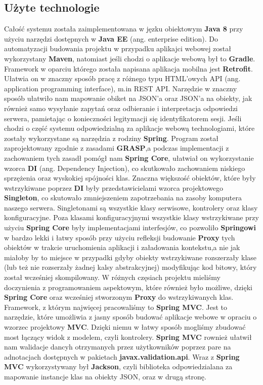 \documentclass[a4paper]{article}
\begin{document}
\subsection{Użyte technologie}
Całość systemu została zaimplementowana w jęzku obiektowym \textbf{Java 8} przy użyciu narzędzi dostępnych w \textbf{Java EE} (ang. enterprise edition). Do automatyzacji budowania projektu w przypadku aplikajci webowej został wykorzystany \textbf{Maven}, natomiast jeśli chodzi o aplikacje webową był to \textbf{Gradle}. Framework w oparciu którego została napisana aplikacja mobilna jest \textbf{Retrofit}. Ułatwia on w znaczny sposób pracę z różnego typu HTML'owych API (ang. application programming interface), m.in REST API. Narzędzie w znaczny sposób ułatwiło nam mapowanie obiket na JSON'a oraz JSON'a na obiekty, jak również samo wysyłanie zapytań oraz odbieranie i interpretacja odpowiedzi serwera, pamietając o konieczności legitymacji się identyfikatorem sesji.
\linebreak
Jeśli chodzi o część systemu odpowiedzialną za aplikacje webową technologiami, które zostały wykorzystane są narzędzia z rodziny \textbf{Spring}. Program został zaprojektowany zgodnie z zasadami \textbf{GRASP},a podczas implementacji z zachowaniem tych zasadł pomógł nam \textbf{Spring Core}, ułatwiał on wykorzystanie wzorca \textbf{DI} (ang. Dependency Injection), co skutkowało zachowaniem niskiego sprzężenia oraz wyskokiej spójności klas. Znaczna większość obiektów, które były wstrzykiwane poprzez \textbf{DI} były przedstawicielami wzorca projektowego \textbf{Singleton}, co skutowało zmniejszeniem zapotrzebania na zasoby komputera naszego serwera. Singletonami są wszystkie klasy serwisowe, kontrolery oraz klasy konfiguracyjne. Poza klasami konfiguracyjnymi wszystkie klasy wstrzykiwane przy użyciu \textbf{Spring Core} były implementacjami interfesjów, co pozwoliło \textbf{Springowi} w bardzo lekki i łatwy sposób przy użyciu refleksji budowanie \textbf{Proxy} tych obiektów w trakcie uruchomienia aplikacji i załadowania kontekstu,a nie jak miałoby by to miejsce w przypadki gdyby obiekty wstrzykiwane rozszerzały klase (lub też nie rozserzały żadnej kalsy abstrakcyjnej) modyfikując kod bitowy, który został wcześniej skompilowany. W różnych częsiach projektu mieliśmy doczynienia z programowaniem aspektowym, które również było możliwe, dzięki \textbf{Spring Core} oraz wcześniej stworzonym \textbf{Proxy} do wstrzykiwanych klas. Framework, z którym najwięcej pracowaliśmy to \textbf{Spring MVC}. Jest to narzędzie, które umożliwia z jasny sposób budować aplikacje webowe w opraciu o wzorzec projektowy \textbf{MVC}. Dzięki niemu w łatwy sposób mogliśmy zbudować most łączący widok z modelem, czyli kontrolery. \textbf{Spring MVC} rownież ułatwił nam walidacje dancyh otrzymanych przez użytkowników poprzez pare na adnotacjach dostępnych w pakietach \textbf{javax.validation.api}. Wraz z \textbf{Spring MVC} wykorzystywany był \textbf{Jackson}, czyli biblioteka odpowiedzialana za mapowanie instancje klas na obiekty JSON, oraz w drugą stronę.
\end{document}
